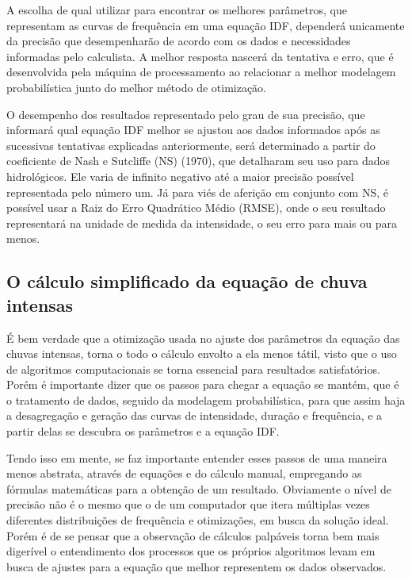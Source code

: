A escolha de qual utilizar para encontrar os melhores parâmetros, que representam as curvas de frequência em uma equação IDF, dependerá unicamente da precisão que desempenharão de acordo com os dados e necessidades informadas pelo calculista. A melhor resposta nascerá da tentativa e erro, que é desenvolvida pela máquina de processamento ao relacionar a melhor modelagem probabilística junto do melhor método de otimização.

\newpage

O desempenho dos resultados representado pelo grau de sua precisão, que informará qual equação IDF melhor se ajustou aos dados informados após as sucessivas tentativas explicadas anteriormente, será determinado a partir do coeficiente de Nash e Sutcliffe (NS) (1970), que detalharam seu uso para dados hidrológicos. Ele varia de infinito negativo até a maior precisão possível representada pelo número um. Já para viés de aferição em conjunto com NS, é possível usar a Raiz do Erro Quadrático Médio (RMSE), onde o seu resultado representará na unidade de medida da intensidade, o seu erro para mais ou para menos.

\subsection{O cálculo simplificado da equação de chuva intensas}

É bem verdade que a otimização usada no ajuste dos parâmetros da equação das chuvas intensas, torna o todo o cálculo envolto a ela menos tátil, visto que o uso de algoritmos computacionais se torna essencial para resultados satisfatórios. Porém é importante dizer que os passos para chegar a equação se mantém, que é o tratamento de dados, seguido da modelagem probabilística, para que assim haja a desagregação e geração das curvas de intensidade, duração e frequência, e a partir delas se descubra os parâmetros e a equação IDF.

Tendo isso em mente, se faz importante entender esses passos de uma maneira menos abstrata, através de equações e do cálculo manual, empregando as fórmulas matemáticas para a obtenção de um resultado. Obviamente o nível de precisão não é o mesmo que o de um computador que itera múltiplas vezes diferentes distribuições de frequência e otimizações, em busca da solução ideal. Porém é de se pensar que a observação de cálculos palpáveis torna bem mais digerível o entendimento dos processos que os próprios algoritmos levam em busca de ajustes para a equação que melhor representem os dados observados.

